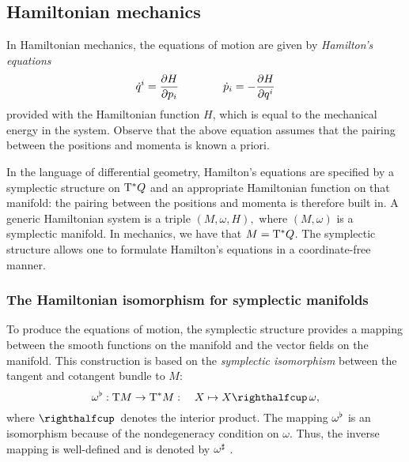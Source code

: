 \subsection{Hamiltonian mechanics}
\label{ssec:symplectic_ham_systems}
In Hamiltonian mechanics, the equations of motion are given by \emph{Hamilton's equations}
\begin{equation}
     \dot{q}^i = \pdv{H}{p_i} \qquad\qquad \dot{p}_i = -\pdv{H}{q^i}
     \label{eq:hamilton_equations}
\end{equation}
provided with the Hamiltonian function \(H\), which is equal to the mechanical energy in the system. Observe that the above equation assumes that the pairing between the positions and momenta is known a priori. 

In the language of differential geometry, Hamilton's equations are specified by a symplectic structure on \(\mathrm{T}^*Q\) and an appropriate Hamiltonian function on that manifold: the pairing between the positions and momenta is therefore built in. A generic Hamiltonian system is a triple \( (M, \omega, H), \) where \( (M, \omega) \) is a symplectic manifold. In mechanics, we have that \( M = \mathrm{T}^*Q \). The symplectic structure allows one to formulate Hamilton's equations in a coordinate-free manner.

\subsubsection{The Hamiltonian isomorphism for symplectic manifolds}
To produce the equations of motion, the symplectic structure provides a mapping between the smooth functions on the manifold and the vector fields on the manifold. 
This construction is based on the \emph{symplectic isomorphism} between the tangent and cotangent bundle to $M$:
\begin{equation}
    \toDual{\omega}: \tbundle{M} \to \ctbundle{M}:\quad X \mapsto \intpr{X}{\omega}, 
    \label{eq:symplectic_isomorphism}
\end{equation}
where $\intpr{}{}$ denotes the interior product. The mapping $\omega^\flat$ is an isomorphism because of the nondegeneracy condition on $\omega$. Thus, the inverse mapping is well-defined and is denoted by \(\omega^\sharp\) \cite{Libermann1987}.

